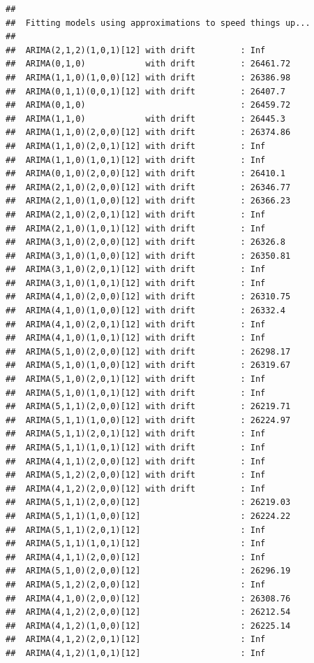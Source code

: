 \documentclass[12pt,]{article}
\begin{document}
\begin{verbatim}
## 
##  Fitting models using approximations to speed things up...
## 
##  ARIMA(2,1,2)(1,0,1)[12] with drift         : Inf
##  ARIMA(0,1,0)            with drift         : 26461.72
##  ARIMA(1,1,0)(1,0,0)[12] with drift         : 26386.98
##  ARIMA(0,1,1)(0,0,1)[12] with drift         : 26407.7
##  ARIMA(0,1,0)                               : 26459.72
##  ARIMA(1,1,0)            with drift         : 26445.3
##  ARIMA(1,1,0)(2,0,0)[12] with drift         : 26374.86
##  ARIMA(1,1,0)(2,0,1)[12] with drift         : Inf
##  ARIMA(1,1,0)(1,0,1)[12] with drift         : Inf
##  ARIMA(0,1,0)(2,0,0)[12] with drift         : 26410.1
##  ARIMA(2,1,0)(2,0,0)[12] with drift         : 26346.77
##  ARIMA(2,1,0)(1,0,0)[12] with drift         : 26366.23
##  ARIMA(2,1,0)(2,0,1)[12] with drift         : Inf
##  ARIMA(2,1,0)(1,0,1)[12] with drift         : Inf
##  ARIMA(3,1,0)(2,0,0)[12] with drift         : 26326.8
##  ARIMA(3,1,0)(1,0,0)[12] with drift         : 26350.81
##  ARIMA(3,1,0)(2,0,1)[12] with drift         : Inf
##  ARIMA(3,1,0)(1,0,1)[12] with drift         : Inf
##  ARIMA(4,1,0)(2,0,0)[12] with drift         : 26310.75
##  ARIMA(4,1,0)(1,0,0)[12] with drift         : 26332.4
##  ARIMA(4,1,0)(2,0,1)[12] with drift         : Inf
##  ARIMA(4,1,0)(1,0,1)[12] with drift         : Inf
##  ARIMA(5,1,0)(2,0,0)[12] with drift         : 26298.17
##  ARIMA(5,1,0)(1,0,0)[12] with drift         : 26319.67
##  ARIMA(5,1,0)(2,0,1)[12] with drift         : Inf
##  ARIMA(5,1,0)(1,0,1)[12] with drift         : Inf
##  ARIMA(5,1,1)(2,0,0)[12] with drift         : 26219.71
##  ARIMA(5,1,1)(1,0,0)[12] with drift         : 26224.97
##  ARIMA(5,1,1)(2,0,1)[12] with drift         : Inf
##  ARIMA(5,1,1)(1,0,1)[12] with drift         : Inf
##  ARIMA(4,1,1)(2,0,0)[12] with drift         : Inf
##  ARIMA(5,1,2)(2,0,0)[12] with drift         : Inf
##  ARIMA(4,1,2)(2,0,0)[12] with drift         : Inf
##  ARIMA(5,1,1)(2,0,0)[12]                    : 26219.03
##  ARIMA(5,1,1)(1,0,0)[12]                    : 26224.22
##  ARIMA(5,1,1)(2,0,1)[12]                    : Inf
##  ARIMA(5,1,1)(1,0,1)[12]                    : Inf
##  ARIMA(4,1,1)(2,0,0)[12]                    : Inf
##  ARIMA(5,1,0)(2,0,0)[12]                    : 26296.19
##  ARIMA(5,1,2)(2,0,0)[12]                    : Inf
##  ARIMA(4,1,0)(2,0,0)[12]                    : 26308.76
##  ARIMA(4,1,2)(2,0,0)[12]                    : 26212.54
##  ARIMA(4,1,2)(1,0,0)[12]                    : 26225.14
##  ARIMA(4,1,2)(2,0,1)[12]                    : Inf
##  ARIMA(4,1,2)(1,0,1)[12]                    : Inf

\end{verbatim}
\end{document}
